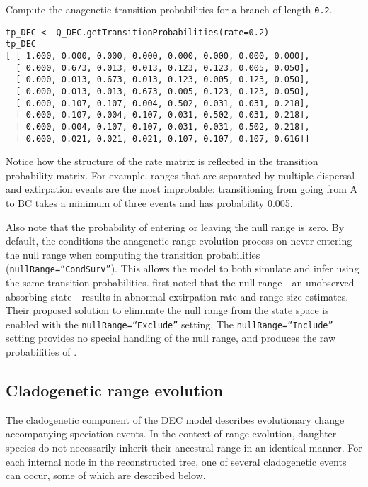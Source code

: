 Compute the anagenetic transition probabilities for a branch of length {\tt 0.2}.

\begin{snugshade}
\begin{lstlisting}
tp_DEC <- Q_DEC.getTransitionProbabilities(rate=0.2)
tp_DEC
[ [ 1.000, 0.000, 0.000, 0.000, 0.000, 0.000, 0.000, 0.000],
  [ 0.000, 0.673, 0.013, 0.013, 0.123, 0.123, 0.005, 0.050],
  [ 0.000, 0.013, 0.673, 0.013, 0.123, 0.005, 0.123, 0.050],
  [ 0.000, 0.013, 0.013, 0.673, 0.005, 0.123, 0.123, 0.050],
  [ 0.000, 0.107, 0.107, 0.004, 0.502, 0.031, 0.031, 0.218],
  [ 0.000, 0.107, 0.004, 0.107, 0.031, 0.502, 0.031, 0.218],
  [ 0.000, 0.004, 0.107, 0.107, 0.031, 0.031, 0.502, 0.218],
  [ 0.000, 0.021, 0.021, 0.021, 0.107, 0.107, 0.107, 0.616]]
\end{lstlisting}
\end{snugshade}

Notice how the structure of the rate matrix is reflected in the transition probability matrix.
For example, ranges that are separated by multiple dispersal and extirpation events are the most improbable: transitioning from going from A to BC takes a minimum of three events and has probability 0.005.

Also note that the probability of entering or leaving the null range is zero.
By default, the \RevBayes conditions the anagenetic range evolution process on never entering the null range when computing the transition probabilities ({\tt nullRange=``CondSurv''}).
This allows the model to both simulate and infer using the same transition probabilities.
\citet{Massana2015} first noted that the null range---an unobserved absorbing state---results in abnormal extirpation rate and range size estimates.
Their proposed solution to eliminate the null range from the state space is enabled with the {\tt nullRange=``Exclude''} setting. 
The {\tt nullRange=``Include''} setting provides no special handling of the null range, and produces the raw probabilities of \citet{Ree2005}.

\subsection*{Cladogenetic range evolution}

The cladogenetic component of the DEC model describes evolutionary change accompanying speciation events.
In the context of range evolution, daughter species do not necessarily inherit their ancestral range in an identical manner.
For each internal node in the reconstructed tree, one of several cladogenetic events can occur, some of which are described below.

